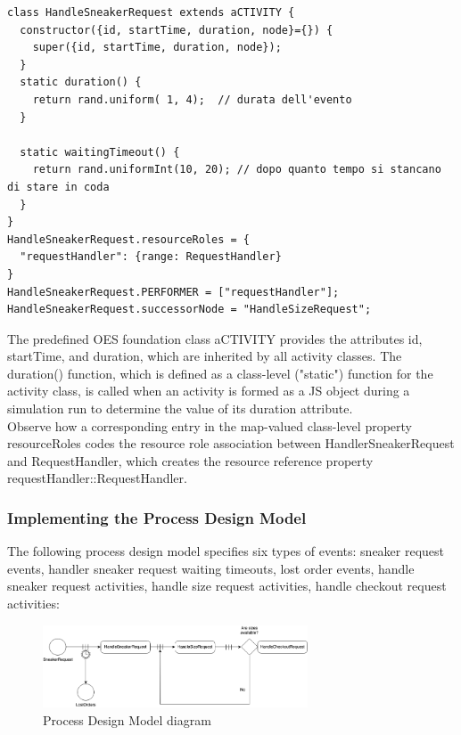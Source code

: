 \documentclass{article}
\begin{document}
\medskip
\begin{lstlisting}[caption=HandleSneakerRequest]
class HandleSneakerRequest extends aCTIVITY {
  constructor({id, startTime, duration, node}={}) {
    super({id, startTime, duration, node});
  }
  static duration() {
    return rand.uniform( 1, 4);  // durata dell'evento
  }

  static waitingTimeout() {
    return rand.uniformInt(10, 20); // dopo quanto tempo si stancano di stare in coda
  }
}
HandleSneakerRequest.resourceRoles = {
  "requestHandler": {range: RequestHandler}
}
HandleSneakerRequest.PERFORMER = ["requestHandler"];
HandleSneakerRequest.successorNode = "HandleSizeRequest";
\end{lstlisting}

The predefined OES foundation class aCTIVITY provides the attributes id, startTime, and duration, which are inherited by all activity classes. The duration() function, which is defined as a class-level ("static") function for the activity class, is called when an activity is formed as a JS object during a simulation run to determine the value of its duration attribute. \\
Observe how a corresponding entry in the map-valued class-level property resourceRoles codes the resource role association between HandlerSneakerRequest and RequestHandler, which creates the resource reference property requestHandler::RequestHandler.

\subsubsection{Implementing the Process Design Model}

The following process design model specifies six types of events: sneaker request events, handler sneaker request waiting timeouts, lost order events, handle sneaker request activities, handle size request activities, handle checkout request activities:

\begin{figure}[h]
    \centering
    \includegraphics[width=0.7\textwidth]{Process_Design_Model}
    \caption{Process Design Model diagram}
\end{figure}
\end{document}
